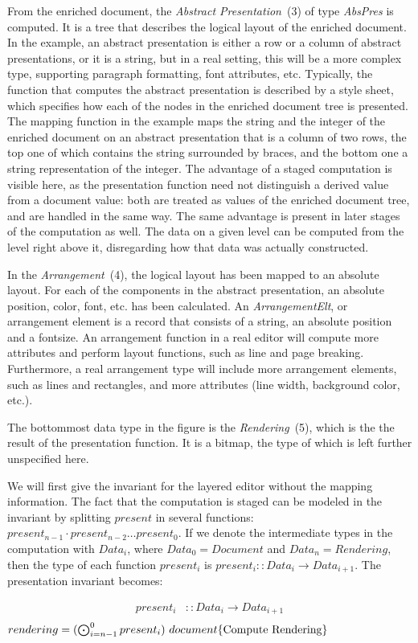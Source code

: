 \documentclass[twoside,epsf]{report}
\begin{document}
From the enriched document, the {\em Abstract Presentation}~(3) of type {\em AbsPres} is computed. It is a tree that describes the logical layout of the enriched document. In the example, an abstract presentation is either a row or a column of abstract presentations, or it is a string, but in a real setting, this will be a more complex type, supporting paragraph formatting, font attributes, etc. Typically, the function that computes the abstract presentation is described by a style sheet, which specifies how each of the nodes in the enriched document tree is presented. The mapping function in the example maps the string and the integer of the enriched document on an abstract presentation that is a column of two rows, the top one of which contains the string surrounded by braces, and the bottom one a string representation of the integer. The advantage of a staged computation is visible here, as the presentation function need not distinguish a derived value from a document value: both are treated as values of the enriched document tree, and are handled in the same way. The same advantage is present in later stages of the computation as well. The data on a given level can be computed from the level right above it, disregarding how that data was actually constructed. 

In the {\em Arrangement}~(4), the logical layout has been mapped to an absolute layout. For each of the components in the abstract presentation, an absolute position, color, font, etc. has been calculated. An {\em ArrangementElt}, or arrangement element is a record that consists of a string, an absolute position and a fontsize. An arrangement function in a real editor will compute more attributes and perform layout functions, such as line and page breaking. Furthermore, a real arrangement type will include more arrangement elements, such as lines and rectangles, and more attributes (line width, background color, etc.).

The bottommost data type in the figure is the {\em Rendering}~(5), which is the the result of the presentation function. It is a bitmap, the type of which is left further unspecified here.

We will first give the invariant for the layered editor without the mapping information. The fact that the computation is staged can be modeled in the invariant by splitting $present$ in several functions: $present_{n-1} \cdot present_{n-2} \dots present_{0}$. If we denote the intermediate types in the computation with $Data_i$, where $Data_0 = Document$ and $Data_n = Rendering$, then the type of each function $present_i$ is $present_i :: Data_i \rightarrow Data_{i+1}$. The presentation invariant becomes:\begin{small}\begin{align*} %
present_i & :: Data_i \rightarrow Data_{i+1} \\
\end{align*}
\begin{math}
rendering = (\bigodot_{i=n-1}^{0} present_i)~document
\hfill \text{\{Compute Rendering\}}
\end{math}\end{small}
\end{document}
